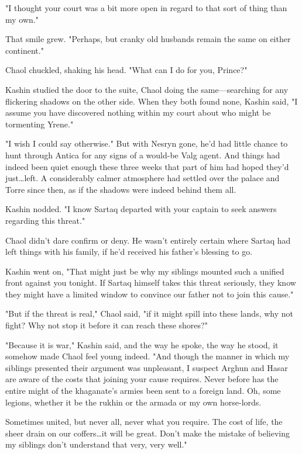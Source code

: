 "I thought your court was a bit more open in regard to that sort of thing than my own."

That smile grew.
"Perhaps, but cranky old husbands remain the same on either continent."

Chaol chuckled, shaking his head.
"What can I do for you, Prince?"

Kashin studied the door to the suite, Chaol doing the same---searching for any flickering shadows on the other side.
When they both found none, Kashin said, "I assume you have discovered nothing within my court about who might be tormenting Yrene."

"I wish I could say otherwise."
But with Nesryn gone, he'd had little chance to hunt through Antica for any signs of a would-be Valg agent.
And things had indeed been quiet enough these three weeks that part of him had hoped they'd just\ldots left.
A considerably calmer atmosphere had settled over the palace and Torre since then, as if the shadows were indeed behind them all.

Kashin nodded.
"I know Sartaq departed with your captain to seek answers regarding this threat."

Chaol didn't dare confirm or deny.
He wasn't entirely certain where Sartaq had left things with his family, if he'd received his father's blessing to go.

Kashin went on, "That might just be why my siblings mounted such a unified front against you tonight.
If Sartaq himself takes this threat seriously, they know they might have a limited window to convince our father not to join this cause."

"But if the threat is real," Chaol said, "if it might spill into these lands, why not fight?
Why not stop it before it can reach these shores?"

"Because it is war," Kashin said, and the way he spoke, the way he stood, it somehow made Chaol feel young indeed.
"And though the manner in which my siblings presented their argument was unpleasant, I suspect Arghun and Hasar are aware of the costs that joining your cause requires.
Never before has the entire might of the khaganate's armies been sent to a foreign land.
Oh, some legions, whether it be the rukhin or the armada or my own horse-lords.

Sometimes united, but never all, never what you require.
The cost of life, the sheer drain on our coffers\ldots it will be great.
Don't make the mistake of believing my siblings don't understand that very, very well."

